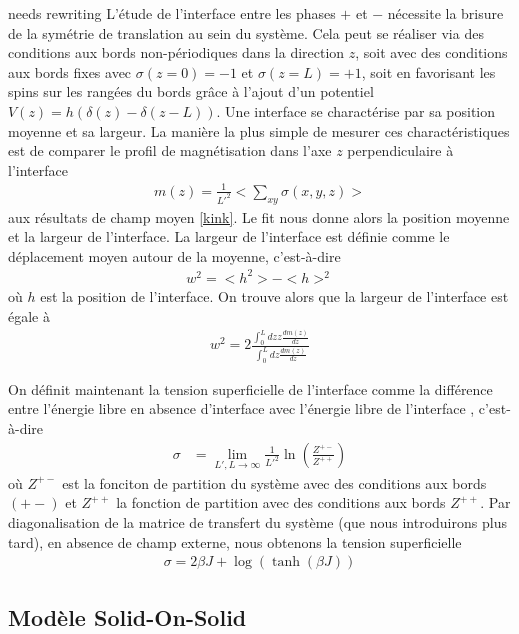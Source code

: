 {\color{red} needs rewriting}
L'étude de l'interface entre les phases $+$ et $-$ nécessite la brisure de la symétrie de translation au sein du système. Cela peut se réaliser via des conditions aux bords non-périodiques dans la direction $z$, soit avec des conditions aux bords fixes avec $\sigma(z=0) = -1$ et $\sigma(z=L)=+1$, soit en favorisant les spins sur les rangées du bords grâce à l'ajout d'un potentiel $V(z) = h (\delta(z)-\delta(z-L))$.
Une interface se charactérise par sa position moyenne et sa largeur. La manière la plus simple de mesurer ces charactéristiques est de comparer le profil de magnétisation \cite{stecki_magnetization_1994}  dans l'axe $z$ perpendiculaire à l'interface
\begin{align}
    m(z) = \frac{1}{L'^2} < \sum_{xy} \sigma(x,y,z) >
\end{align}
aux résultats de champ moyen \ref{kink}. Le fit nous donne alors la position moyenne et la largeur de l'interface. La largeur de l'interface est définie comme le déplacement moyen autour de la moyenne, c'est-à-dire
\begin{align}
    w^2 = <h^2>-<h>^2
\end{align}
où $h$ est la position de l'interface. On trouve alors que la largeur de l'interface est égale à
\begin{align}
    w^2 = 2 \frac{ \int_0^L dz z \frac{d m(z)}{dz}}{\int_0^L dz \frac{d m(z)}{dz}}
\end{align}
 
On définit maintenant la tension superficielle de l'interface comme la différence entre l'énergie libre en absence d'interface avec l'énergie libre de l'interface \cite{abraham_transfer_1973,abraham_interface_1976,richards_numerical_1993}, c'est-à-dire
\begin{align}
    \sigma &= \lim_{L',L \to \infty} \frac{1}{L'^2} \ln \left( \frac{Z^{+-}}{Z^{++}} \right) 
\end{align}
où $Z^{+-}$ est la fonciton de partition du système avec des conditions aux bords $(+-)$ et $Z^{++}$ la fonction de partition avec des conditions aux bords $Z^{++}$.
Par diagonalisation de la matrice de transfert du système (que nous introduirons plus tard), en absence de champ externe, nous obtenons la tension superficielle
\begin{align}
    \sigma = 2 \beta J + \log(\tanh(\beta J))    
\end{align}

    \subsection{Modèle Solid-On-Solid}

